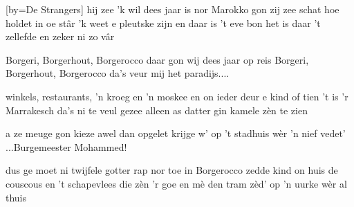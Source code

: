 [by={De Strangers}]
\beginverse
hij zee 'k wil dees jaar is nor Marokko gon
zij zee schat hoe holdet in oe st\^ar
'k weet e pleutske zijn en daar is 't eve bon
het is daar 't zellefde en zeker ni zo v\^ar
\endverse

\beginchorus
Borgeri, Borgerhout, Borgerocco
daar gon wij dees jaar op reis
Borgeri, Borgerhout, Borgerocco
da's veur mij het paradijs....
\endchorus

\beginverse
winkels, restaurants, 'n kroeg en 'n moskee
en on ieder deur e kind of tien
't is 'r Marrakesch da's ni te veul gezee
alleen as datter gin kamele z\`en te zien
\endverse

\beginverse
a ze meuge gon kieze awel dan opgelet
krijge w' op 't stadhuis w\`er 'n nief vedet' ...Burgemeester Mohammed!

dus ge moet ni twijfele gotter rap nor toe
in Borgerocco zedde kind on huis
de couscous en 't schapevlees die z\`en 'r goe
en m\`e den tram z\`ed' op 'n uurke w\`er al thuis
\endverse

\endsong
